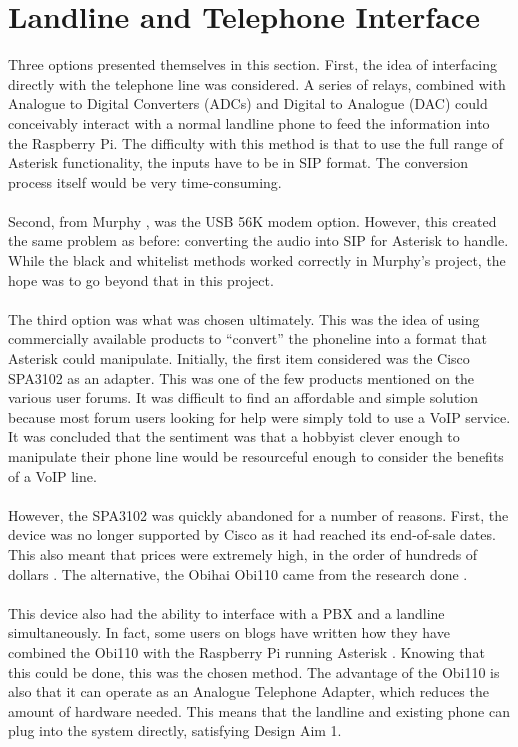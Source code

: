 \documentclass[main.tex]{subfiles}
\begin{document}
\section{Landline and Telephone Interface}
Three options presented themselves in this section. First, the idea of interfacing directly with the telephone line was considered. A series of relays, combined with Analogue to Digital Converters (ADCs) and Digital to Analogue (DAC) could conceivably interact with a normal landline phone to feed the information into the Raspberry Pi. The difficulty with this method is that to use the full range of Asterisk functionality, the inputs have to be in SIP format. The conversion process itself would be very time-consuming.
\\\\
Second, from Murphy \cite{murphy}, was the USB 56K modem option. However, this created the same problem as before: converting the audio into SIP for Asterisk to handle. While the black and whitelist methods worked correctly in Murphy's project, the hope was to go beyond that in this project.
\\\\
The third option was what was chosen ultimately. This was the idea of using commercially available products to ``convert'' the phoneline into a format that Asterisk could manipulate. Initially, the first item considered was the Cisco SPA3102 \cite{spa3102-specs} as an adapter. This was one of the few products mentioned on the various user forums. It was difficult to find an affordable and simple solution because most forum users looking for help were simply told to use a VoIP service. It was concluded that the sentiment was that a hobbyist clever enough to manipulate their phone line would be resourceful enough to consider the benefits of a VoIP line.
\\\\
However, the SPA3102 was quickly abandoned for a number of reasons. First, the device was no longer supported by Cisco as it had reached its end-of-sale dates. This also meant that prices were extremely high, in the order of hundreds of dollars \cite{spa3102-amazon}. The alternative, the Obihai Obi110 \cite{obi110-specs} came from the research done \cite{bryanross}.
\\\\
This device also had the ability to interface with a PBX and a landline simultaneously. In fact, some users on blogs have written how they have combined the Obi110 with the Raspberry Pi running Asterisk \cite{bryanross}. Knowing that this could be done, this was the chosen method. The advantage of the Obi110 is also that it can operate as an Analogue Telephone Adapter, which reduces the amount of hardware needed. This means that the landline and existing phone can plug into the system directly, satisfying Design Aim 1.
\end{document}
